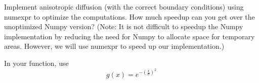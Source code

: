 \begin{problem}
\label{prob:anisdiff_bw}

%
%
%
%
% 

Implement anisotropic diffusion (with the correct boundary conditions) using numexpr to optimize the computations.  How much speedup can you get over the unoptimized Numpy version? (Note: It is not difficult to speedup the Numpy implementation by reducing the need for Numpy to allocate space for temporary areas. However, we will use numexpr to speed up our implementation.)  

In your function, use
\[g(x) = e^{-\left(\frac{x}{\sigma}\right)^2}\]
\end{problem}

